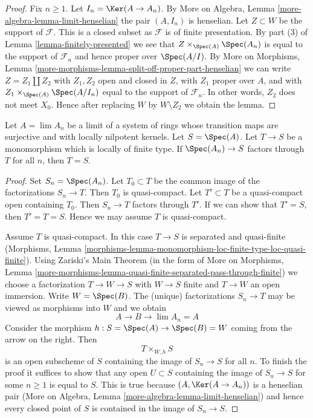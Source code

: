 \begin{proof}
Fix $n \geq 1$. Let $I_n = \Ker(A \to A_n)$.
By More on Algebra, Lemma \ref{more-algebra-lemma-limit-henselian}
the pair $(A, I_n)$ is henselian.
Let $Z \subset W$ be the support of $\mathcal{F}$.
This is a closed subset as $\mathcal{F}$ is of finite presentation.
By part (3) of Lemma \ref{lemma-finitely-presented}
we see that $Z \times_{\Spec(A)} \Spec(A_n)$
is equal to the support of $\mathcal{F}_n$ and hence
proper over $\Spec(A/I)$.
By More on Morphisms, Lemma
\ref{more-morphisms-lemma-split-off-proper-part-henselian}
we can write $Z = Z_1 \amalg Z_2$ with $Z_1, Z_2$ open and
closed in $Z$, with $Z_1$ proper
over $A$, and with $Z_1 \times_{\Spec(A)} \Spec(A/I_n)$
equal to the support of $\mathcal{F}_n$.
In other words, $Z_2$ does not meet $X_0$.
Hence after replacing $W$ by $W \setminus Z_2$ we obtain the lemma.
\end{proof}

\begin{lemma}
\label{lemma-monomorphism-isomorphism}
Let $A = \lim A_n$ be a limit of a system of rings
whose transition maps are surjective and with locally nilpotent
kernels. Let $S = \Spec(A)$. Let $T \to S$ be a monomorphism
which is locally of finite type. If $\Spec(A_n) \to S$
factors through $T$ for all $n$, then $T = S$.
\end{lemma}

\begin{proof}
Set $S_n = \Spec(A_n)$. Let $T_0 \subset T$ be the common
image of the factorizations $S_n \to T$. Then $T_0$ is quasi-compact.
Let $T' \subset T$ be a quasi-compact open containing $T_0$.
Then $S_n \to T$ factors through $T'$.
If we can show that $T' = S$, then $T' = T = S$.
Hence we may assume $T$ is quasi-compact.

\medskip\noindent
Assume $T$ is quasi-compact.
In this case $T \to S$ is separated and quasi-finite
(Morphisms, Lemma
\ref{morphisms-lemma-monomorphism-loc-finite-type-loc-quasi-finite}).
Using Zariski's Main Theorem
(in the form of More on Morphisms, Lemma
\ref{more-morphisms-lemma-quasi-finite-separated-pass-through-finite})
we choose a factorization $T \to W \to S$ with $W \to S$ finite
and $T \to W$ an open immersion. Write $W = \Spec(B)$.
The (unique) factorizations $S_n \to T$ may be viewed
as morphisms into $W$ and we obtain
$$
A \longrightarrow B \longrightarrow \lim A_n = A
$$
Consider the morphism $h : S = \Spec(A) \to \Spec(B) = W$ coming
from the arrow on the right. Then
$$
T \times_{W, h} S
$$
is an open subscheme of $S$ containing the image of $S_n \to S$ for all $n$.
To finish the proof it suffices to show that any open $U \subset S$
containing the image of $S_n \to S$ for some $n \geq 1$ is equal to $S$.
This is true because $(A, \Ker(A \to A_n))$ is a henselian pair
(More on Algebra, Lemma \ref{more-algebra-lemma-limit-henselian})
and hence every closed point of $S$ is contained in the image of $S_n \to S$.
\end{proof}

